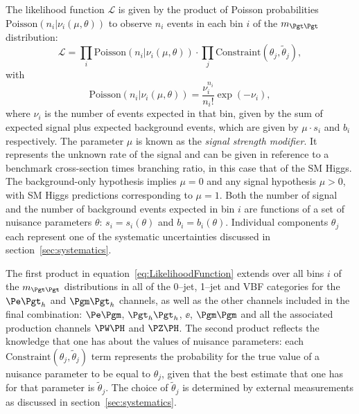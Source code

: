 The likelihood function $\mathcal{L}$ is given by the product of Poisson probabilities 
$\mathrm{Poisson}(n_{i} \vert \nu_{i}(\mu, \theta))$ to observe $n_{i}$ events in each bin
$i$ of the $m_{\Pgt\Pgt}$ distribution:
\begin{equation}
\mathcal{L} = \prod_{i} \mathrm{Poisson}(n_{i} \vert \nu_{i}(\mu, \theta)) \cdot
\prod_{j} \mathrm{Constraint}(\theta_{j}, \tilde{\theta}_{j}),
\label{eq:LikelihoodFunction}
\end{equation}
with
\begin{equation}
\mathrm{Poisson} ( n_{i} \vert \nu_{i}(\mu, \theta )) = \frac{\nu_{i}^{n_{i}}}{n_{i}!} \exp ( -\nu_{i} ),
\label{eq:PoissonDistribution}
\end{equation}
where $\nu_{i}$ is the number of events expected in that bin,
given by the sum of expected signal plus expected background events,
which are given by $\mu \cdot s_{i}$ and $b_{i}$ respectively.
The parameter $\mu$ is known as the \emph{signal strength modifier}. 
It represents the unknown rate of the signal and can be given in reference to a
benchmark cross-section times branching ratio, in this case that of the \ac{SM}
Higgs. The background-only hypothesis implies $\mu = 0$ and any signal hypothesis $
\mu > 0$, with \ac{SM} Higgs predictions corresponding to $\mu = 1$.
Both the number of signal and the number of background events expected in bin $i$ 
are functions of a set of nuisance parameters $\theta$:
$s_{i} = s_{i} ( \theta )$ and $b_{i} = b_{i} ( \theta )$.
Individual components $\theta_{j}$ each represent one of the systematic uncertainties
discussed in section~\ref{sec:systematics}.

The first product in equation~\ref{eq:LikelihoodFunction} extends over all bins $i$
of the $m_{\Pgt\Pgt}$ distributions in all of the 0--jet, 1--jet and VBF categories 
for the $\etau$ and $\mutau$ channels, as well as the other channels included in
the final combination: $\emu$, $\tautau$, $\ee$, $\mumu$ and all the
associated production channels $\PW\PH$ and $\PZ\PH$. 
The second product reflects the knowledge that one has about the values of nuisance parameters:
each $\mathrm{Constraint}(\theta_{j}, \tilde{\theta}_{j})$ 
term represents the probability for the true value of a nuisance parameter to be equal to $\theta_{j}$,
given that the best estimate that one has for that parameter is
$\tilde{\theta}_{j}$. The choice of $\tilde{\theta}_{j}$ is determined by
external measurements as discussed in section~\ref{sec:systematics}.

